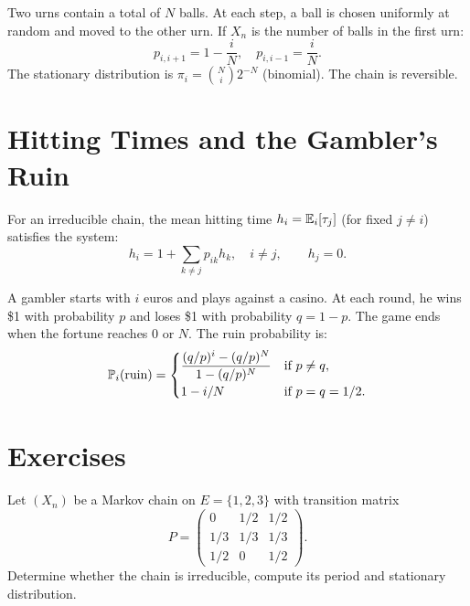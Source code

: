 \begin{example}
Two urns contain a total of $N$ balls. At each step, a ball is chosen uniformly
at random and moved to the other urn. If $X_n$ is the number of balls in the
first urn:
\[
  p_{i,i+1} = 1 - \frac{i}{N}, \quad p_{i,i-1} = \frac{i}{N}.
\]
The stationary distribution is $\pi_i = \binom{N}{i} 2^{-N}$ (binomial).
The chain is reversible.
\end{example}

\section{Hitting Times and the Gambler's Ruin}

\begin{proposition}
For an irreducible chain, the mean hitting time $h_i = \mathbb{E}_i[\tau_j]$ (for
fixed $j \neq i$) satisfies the system:
\[
  h_i = 1 + \sum_{k \neq j} p_{ik} h_k, \quad i \neq j, \qquad h_j = 0.
\]
\end{proposition}

\begin{example}
A gambler starts with $i$ euros and plays against a casino. At each round, he
wins \$1 with probability $p$ and loses \$1 with probability $q = 1-p$. The game
ends when the fortune reaches $0$ or $N$. The ruin probability is:
\[
  \mathbb{P}_i(\text{ruin}) = \begin{cases}
    \displaystyle \frac{(q/p)^i - (q/p)^N}{1 - (q/p)^N} & \text{if } p \neq q, \\[6pt]
    1 - i/N & \text{if } p = q = 1/2.
  \end{cases}
\]
\end{example}

\section{Exercises}

\begin{exercise}
Let $(X_n)$ be a Markov chain on $E = \{1, 2, 3\}$ with transition matrix
\[
  P = \begin{pmatrix} 0 & 1/2 & 1/2 \\ 1/3 & 1/3 & 1/3 \\ 1/2 & 0 & 1/2 \end{pmatrix}.
\]
Determine whether the chain is irreducible, compute its period and stationary
distribution.
\end{exercise}

